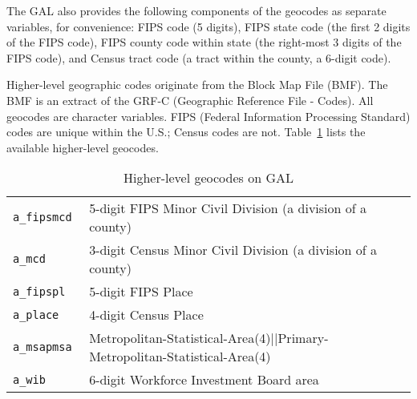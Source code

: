 % 

The GAL also provides the following components of the geocodes as separate
variables, for convenience: FIPS code
(5 digits), FIPS state code (the first 2 digits of the FIPS code), FIPS
county code within state (the right-most 3 digits of the FIPS code), and
Census tract code (a tract within the county, a 6-digit code).
%

Higher-level geographic codes originate from the Block Map File (BMF). 
The BMF is an extract of the GRF-C (Geographic Reference File - Codes). All geocodes are
character variables. FIPS (Federal Information Processing Standard) codes are unique within the U.S.;
Census codes are not. Table~\ref{tab:gal:geocodes_hi} lists
 the available higher-level geocodes.

\begin{table}[htbp]
  \centering
  \caption{Higher-level geocodes on GAL}
  \label{tab:gal:geocodes_hi}
  \begin{tabular}{ll}
\hline
\hline
\tt a\_fipsmcd  &    5-digit FIPS Minor Civil Division (a division of a county)                    \\
\tt a\_mcd      &    3-digit Census Minor Civil Division (a division of a county)                  \\
\tt a\_fipspl   &    5-digit FIPS Place                                                            \\
\tt a\_place    &    4-digit Census Place                                                          \\
\tt a\_msapmsa  &    Metropolitan-Statistical-Area(4)||Primary-Metropolitan-Statistical-Area(4)    \\
\tt a\_wib      &    6-digit Workforce Investment Board area                                       \\ 
\hline
  \end{tabular}
\end{table}




